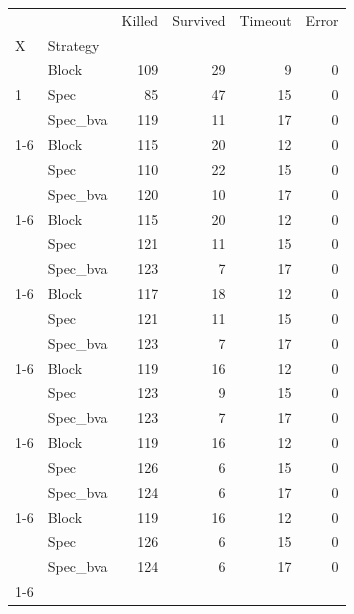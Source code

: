 \begin{tabular}{llrrrr}
\toprule
 &  & Killed & Survived & Timeout & Error \\
X & Strategy &  &  &  &  \\
\midrule
\multirow[t]{3}{*}{1} & Block & 109 & 29 & 9 & 0 \\
 & Spec & 85 & 47 & 15 & 0 \\
 & Spec_bva & 119 & 11 & 17 & 0 \\
\cline{1-6}
\multirow[t]{3}{*}{2} & Block & 115 & 20 & 12 & 0 \\
 & Spec & 110 & 22 & 15 & 0 \\
 & Spec_bva & 120 & 10 & 17 & 0 \\
\cline{1-6}
\multirow[t]{3}{*}{3} & Block & 115 & 20 & 12 & 0 \\
 & Spec & 121 & 11 & 15 & 0 \\
 & Spec_bva & 123 & 7 & 17 & 0 \\
\cline{1-6}
\multirow[t]{3}{*}{4} & Block & 117 & 18 & 12 & 0 \\
 & Spec & 121 & 11 & 15 & 0 \\
 & Spec_bva & 123 & 7 & 17 & 0 \\
\cline{1-6}
\multirow[t]{3}{*}{5} & Block & 119 & 16 & 12 & 0 \\
 & Spec & 123 & 9 & 15 & 0 \\
 & Spec_bva & 123 & 7 & 17 & 0 \\
\cline{1-6}
\multirow[t]{3}{*}{6} & Block & 119 & 16 & 12 & 0 \\
 & Spec & 126 & 6 & 15 & 0 \\
 & Spec_bva & 124 & 6 & 17 & 0 \\
\cline{1-6}
\multirow[t]{3}{*}{7} & Block & 119 & 16 & 12 & 0 \\
 & Spec & 126 & 6 & 15 & 0 \\
 & Spec_bva & 124 & 6 & 17 & 0 \\
\cline{1-6}
\bottomrule
\end{tabular}

